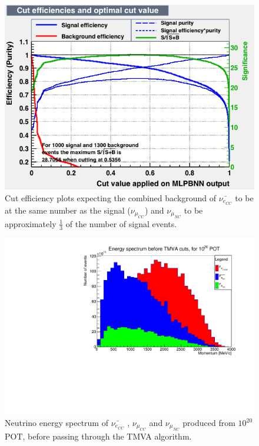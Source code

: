 \begin{figure}[h!]
\centering
\includegraphics[width=\textwidth]{figures/NeutrinoChap/mvaeffs_MLPBNN10001300.png}
\caption{Cut efficiency plots expecting the combined background of $\bar{\nu_{e_{CC}}}$ to be at the same number as the signal ($\nu_{\mu_{CC}}$) and $\nu_{\mu_{NC}}$ to be approximately $\frac{1}{3}$ of the number of signal events. }
\label{fig:TMVANeucuts}
\end{figure}

\begin{figure}[h!]
\centering
\includegraphics[width=.9\textwidth]{figures/NeutrinoChap/SpectrumBeforeTMVA.pdf}
\caption{Neutrino energy spectrum of $\bar{\nu_{e_{CC}}}$ , $\nu_{\mu_{CC}}$ and $\nu_{\mu_{NC}}$ produced from $10^{20}$ POT, before passing through the TMVA algorithm.}
\label{fig:TMVAEspectrumBefore}
\end{figure}


